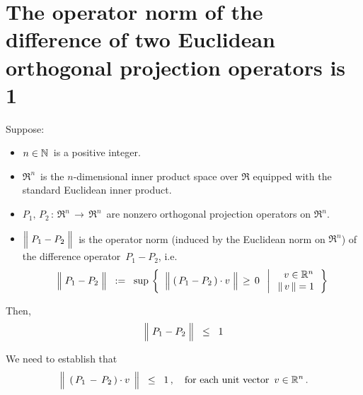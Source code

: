 

\section{The operator norm of the difference of two Euclidean orthogonal projection operators is 1}
\setcounter{theorem}{0}
\setcounter{equation}{0}


\renewcommand{\theenumi}{\roman{enumi}}
\renewcommand{\labelenumi}{\textnormal{(\theenumi)}$\;\;$}


\begin{proposition}
\mbox{}\vskip 0.1cm
\noindent
Suppose:
\begin{itemize}
\item
	$n \in \mathbb{N}$\, is a positive integer.
\item
	$\Re^{n}$\, is the $n$-dimensional inner product space over $\Re$ equipped with the standard Euclidean inner product.
\item
	$P_{1}, \, P_{2} \, : \, \Re^{n} \, \longrightarrow \, \Re^{n}$\,
	are nonzero orthogonal projection operators on $\Re^{n}$.
\item
	$\left\Vert\; P_{1} \overset{{\color{white}.}}{-} P_{2} \;\right\Vert$\,
	is the operator norm (induced by the Euclidean norm on $\Re^{n}$)
	of the difference operator \,$P_{1} - P_{2}$, i.e.
	\begin{equation*}
	\left\Vert\; P_{1} \overset{{\color{white}.}}{-} P_{2} \;\right\Vert
	\;\; := \;\;
		\sup\,\left\{\;\;
			\left\Vert\;(\,P_{1} \overset{{\color{white}.}}{-} P_{2}\,) \cdot v \;\right\Vert \,\geq\, 0
			\;\;\left\vert\;
			\begin{array}{c}
				{\color{white}..}v \in \Re^{n} \\ \Vert\,v\,\Vert = 1
				\end{array}
			\right.\right\}
	\end{equation*}
\end{itemize}
Then,
\begin{equation*}
\left\Vert\; P_{1} \overset{{\color{white}.}}{-} P_{2} \;\right\Vert
\;\; \leq \;\;
	1
\end{equation*}
\end{proposition}
\proof
We need to establish that
\begin{equation}\label{wantToProve}
\left\Vert\;\, (\,P_{1} \,\overset{{\color{white}.}}{-}\, P_{2}\,)\cdot v \,\;\right\Vert
\;\; \leq \;\;
	1\,,
\quad
\textnormal{for each unit vector \,$v \in \Re^{n}$}\,.
\end{equation}
